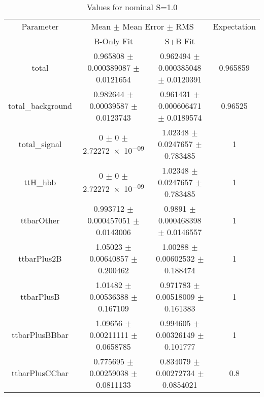 \begin{table}
\centering
\caption{Values for nominal S=1.0}
\begin{tabular}{cccc}
\toprule
Parameter & \multicolumn{2}{c}{Mean $\pm$ Mean Error $\pm$ RMS} & Expectation\\
 & B-Only Fit & S+B Fit & \\
\midrule
total & \num{0.965808} $\pm$ \num{0.000389087} $\pm$ \num{0.0121654} & \num{0.962494} $\pm$ \num{0.000385048} $\pm$ \num{0.0120391} & \num{0.965859}\\
total\_background & \num{0.982644} $\pm$ \num{0.00039587} $\pm$ \num{0.0123743} & \num{0.961431} $\pm$ \num{0.000606471} $\pm$ \num{0.0189574} & \num{0.96525}\\
total\_signal & \num{0} $\pm$ \num{0} $\pm$ \num{2.72272e-09} & \num{1.02348} $\pm$ \num{0.0247657} $\pm$ \num{0.783485} & \num{1}\\
ttH\_hbb & \num{0} $\pm$ \num{0} $\pm$ \num{2.72272e-09} & \num{1.02348} $\pm$ \num{0.0247657} $\pm$ \num{0.783485} & \num{1}\\
ttbarOther & \num{0.993712} $\pm$ \num{0.000457051} $\pm$ \num{0.0143006} & \num{0.9891} $\pm$ \num{0.000468398} $\pm$ \num{0.0146557} & \num{1}\\
ttbarPlus2B & \num{1.05023} $\pm$ \num{0.00640857} $\pm$ \num{0.200462} & \num{1.00288} $\pm$ \num{0.00602532} $\pm$ \num{0.188474} & \num{1}\\
ttbarPlusB & \num{1.01482} $\pm$ \num{0.00536388} $\pm$ \num{0.167109} & \num{0.971783} $\pm$ \num{0.00518009} $\pm$ \num{0.161383} & \num{1}\\
ttbarPlusBBbar & \num{1.09656} $\pm$ \num{0.00211111} $\pm$ \num{0.0658785} & \num{0.994605} $\pm$ \num{0.00326149} $\pm$ \num{0.101777} & \num{1}\\
ttbarPlusCCbar & \num{0.775695} $\pm$ \num{0.00259038} $\pm$ \num{0.0811133} & \num{0.834079} $\pm$ \num{0.00272734} $\pm$ \num{0.0854021} & \num{0.8}\\
\bottomrule
\end{tabular}
\end{table}
